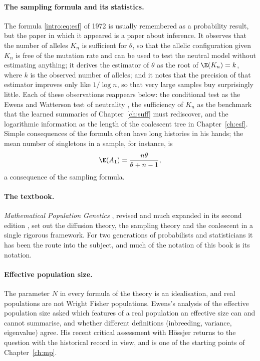 \paragraph{The sampling formula and its statistics.} The formula \eqref{intro:eq:esf} of 1972 is
usually remembered as a probability result, but the paper in which it appeared
\citep{intro:ewens1972} is a paper about inference. It observes that the number of alleles $K_n$
is sufficient for $\theta$, so that the allelic configuration given $K_n$ is free of the mutation
rate and can be used to test the neutral model without estimating anything; it derives the
estimator of $\theta$ as the root of $\E(K_n)=k$, where $k$ is the observed number of alleles; and it notes that the precision of that
estimator improves only like $1/\log n$, so that very large samples buy surprisingly little.
Each of these observations reappears below: the conditional test as the Ewens and Watterson test
of neutrality \citep{intro:watterson1978}, the sufficiency of $K_n$ as the benchmark that the
learned summaries of Chapter~\ref{ch:suff} must rediscover, and the logarithmic information as the
length of the coalescent tree in Chapter~\ref{ch:esf}. Simple consequences of the formula often
have long histories in his hands; the mean number of singletons in a sample, for instance, is
\begin{equation*}
\E(A_1)=\frac{n\theta}{\theta+n-1},
\end{equation*}
a consequence of the sampling formula.

\paragraph{The textbook.} \emph{Mathematical Population Genetics} \citep{intro:ewens1979}, revised
and much expanded in its second edition \citep{intro:ewens2004}, set out the diffusion theory, the
sampling theory and the coalescent in a single rigorous framework. For two generations of
probabilists and statisticians it has been the route into the subject, and much of the notation of
this book is its notation.

\paragraph{Effective population size.} The parameter $N$ in every formula of the theory is an
idealisation, and real populations are not Wright Fisher populations. Ewens's analysis of the
effective population size \citep{intro:ewens1982} asked which features of a real population an
effective size can and cannot summarise, and whether different definitions (inbreeding,
variance, eigenvalue) agree. His recent critical assessment with H\"ossjer
\citep{intro:ewens2025b} returns to the question with the historical record in view, and is one of
the starting points of Chapter~\ref{ch:mp}.

